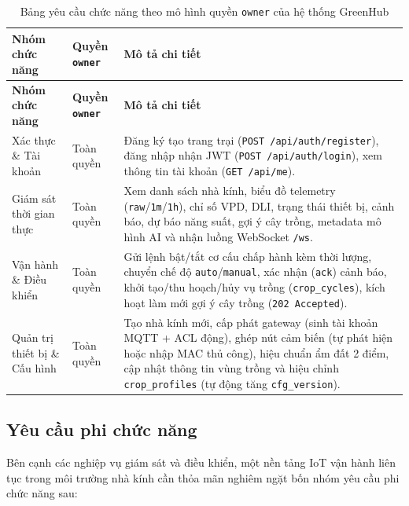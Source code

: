\begingroup
\footnotesize
\setlength{\tabcolsep}{3.5pt}
\renewcommand{\arraystretch}{1.12}
\begin{longtable}{|>{\raggedright\arraybackslash}p{}|>{\centering\arraybackslash}p{}|>{\raggedright\arraybackslash}p{}|}
\caption{Bảng yêu cầu chức năng theo mô hình quyền \texttt{owner} của hệ thống GreenHub}\label{tab:owner-func-matrix}\\
\hline
\textbf{Nhóm chức năng} & \textbf{Quyền \texttt{owner}} & \textbf{Mô tả chi tiết} \\
\hline
\endfirsthead
\hline
\textbf{Nhóm chức năng} & \textbf{Quyền \texttt{owner}} & \textbf{Mô tả chi tiết} \\
\hline
\endhead
Xác thực \& Tài khoản & Toàn quyền & Đăng ký tạo trang trại (\texttt{POST /api/auth/register}), đăng nhập nhận JWT (\texttt{POST /api/auth/login}), xem thông tin tài khoản (\texttt{GET /api/me}). \\
\hline
Giám sát thời gian thực & Toàn quyền & Xem danh sách nhà kính, biểu đồ telemetry (\texttt{raw}/\texttt{1m}/\texttt{1h}), chỉ số VPD, DLI, trạng thái thiết bị, cảnh báo, dự báo năng suất, gợi ý cây trồng, metadata mô hình AI và nhận luồng WebSocket \texttt{/ws}. \\
\hline
Vận hành \& Điều khiển & Toàn quyền & Gửi lệnh bật/tắt cơ cấu chấp hành kèm thời lượng, chuyển chế độ \texttt{auto}/\texttt{manual}, xác nhận (\texttt{ack}) cảnh báo, khởi tạo/thu hoạch/hủy vụ trồng (\texttt{crop\_cycles}), kích hoạt làm mới gợi ý cây trồng (\texttt{202 Accepted}). \\
\hline
Quản trị thiết bị \& Cấu hình & Toàn quyền & Tạo nhà kính mới, cấp phát gateway (sinh tài khoản MQTT + ACL động), ghép nút cảm biến (tự phát hiện hoặc nhập MAC thủ công), hiệu chuẩn ẩm đất 2 điểm, cập nhật thông tin vùng trồng và hiệu chỉnh \texttt{crop\_profiles} (tự động tăng \texttt{cfg\_version}). \\
\hline
\end{longtable}
\endgroup

\subsection{Yêu cầu phi chức năng}
\label{subsec:c3-nonfunc-req}

Bên cạnh các nghiệp vụ giám sát và điều khiển, một nền tảng IoT vận hành liên tục trong môi trường nhà kính cần thỏa mãn nghiêm ngặt bốn nhóm yêu cầu phi chức năng sau:

